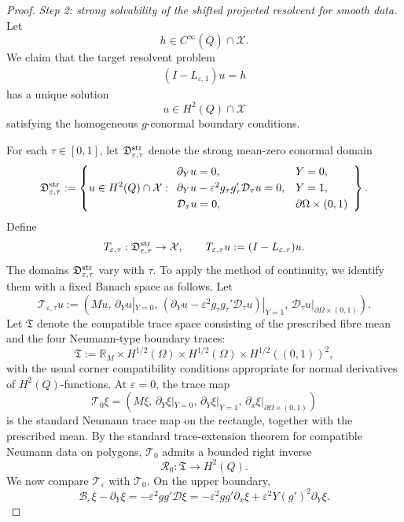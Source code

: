 \documentclass[11pt]{article}
\theoremstyle{definition}
\theoremstyle{remark}
\numberwithin{equation}{section}
\begin{document}
\begin{proof}
\emph{Step 2: strong solvability of the shifted projected resolvent for
smooth data.}
Let
\[
h\in C^\infty(\overline Q)\cap\mathcal X .
\]
We claim that the target resolvent problem
\begin{align}
(I-L_{\varepsilon,1})u=h
\label{eq:target-projected-resolvent}
\end{align}
has a unique solution
\[
u\in H^2(Q)\cap\mathcal X
\]
satisfying the homogeneous \(g\)-conormal boundary conditions.

For each \(\tau\in[0,1]\), let \(\mathfrak D_{\varepsilon,\tau}^{\rm str}\)
denote the strong mean-zero conormal domain
\[
\mathfrak D_{\varepsilon,\tau}^{\rm str}
:=
\left\{
u\in H^2(Q)\cap\mathcal X:
\begin{array}{ll}
\partial_Yu=0, & Y=0,\\[1mm]
\partial_Yu-\varepsilon^2g_\tau g_\tau'\mathcal D_\tau u=0, & Y=1,\\[1mm]
\mathcal D_\tau u=0, & \partial\Omega\times(0,1)
\end{array}
\right\}.
\]
Define
\[
T_{\varepsilon,\tau}
:
\mathfrak D_{\varepsilon,\tau}^{\rm str}\to\mathcal X,
\qquad
T_{\varepsilon,\tau}u:=(I-L_{\varepsilon,\tau})u .
\]
The domains \(\mathfrak D_{\varepsilon,\tau}^{\rm str}\) vary with \(\tau\).
To apply the method of continuity, we identify them with a fixed Banach space
as follows. Let
\[
\mathcal T_{\varepsilon,\tau}u
:=
\left(
Mu,\,
\partial_Yu|_{Y=0},\,
(\partial_Yu-\varepsilon^2g_\tau g_\tau'\mathcal D_\tau u)|_{Y=1},\,
\mathcal D_\tau u|_{\partial\Omega\times(0,1)}
\right).
\]
Let \(\mathfrak T\) denote the compatible trace space consisting of the
prescribed fibre mean and the four Neumann-type boundary traces:
\[
\mathfrak T
:=
\mathbb R_M
\times H^{1/2}(\Omega)
\times H^{1/2}(\Omega)
\times H^{1/2}((0,1))^2,
\]
with the usual corner compatibility conditions appropriate for normal
derivatives of \(H^2(Q)\)-functions. At \(\varepsilon=0\), the trace map
\[
\mathcal T_0\xi
=
\left(
M\xi,\,
\partial_Y\xi|_{Y=0},\,
\partial_Y\xi|_{Y=1},\,
\partial_x\xi|_{\partial\Omega\times(0,1)}
\right)
\]
is the standard Neumann trace map on the rectangle, together with the
prescribed mean. By the standard trace-extension theorem for compatible
Neumann data on polygons, \(\mathcal T_0\) admits a bounded right inverse
\[
\mathcal R_0:\mathfrak T\to H^2(Q).
\]
We now compare \(\mathcal T_\varepsilon\) with \(\mathcal T_0\). On the upper
boundary,
\[
\mathcal B_\varepsilon\xi-\partial_Y\xi
=
-\varepsilon^2gg'\mathcal D\xi
=
-\varepsilon^2gg'\partial_x\xi
+\varepsilon^2Y(g')^2\partial_Y\xi .
\]
\end{proof}
\end{document}
